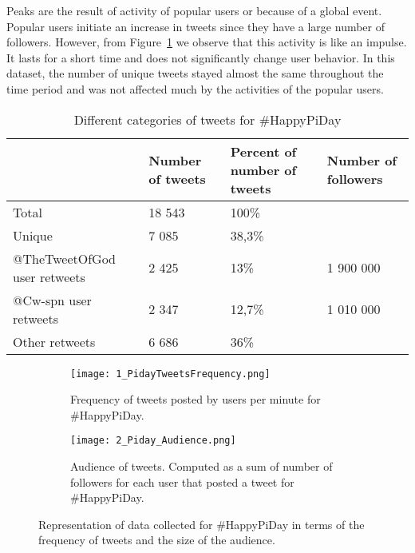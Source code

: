 \documentclass[journal, a4paper, 12pt]{article}
\begin{document}
Peaks are the result of activity of popular users or because of a global event. Popular users initiate an increase in tweets since they have a large number of followers. However, from Figure~\ref{fig:piday_freq_tweets} we observe that this activity is like an impulse. It lasts for a short time and does not significantly change user behavior. In this dataset, the number of unique tweets stayed almost the same throughout the time period and was not affected much by the activities of the popular users.
\\
	
    
    \begin{table}[!hbt]
		\begin{center}
		\caption{Different categories of tweets for \#HappyPiDay}
		\label{tab:numberoftweets_piday}
		\begin{tabular}{|p{4cm}|p{2cm}|p{2cm}|p{2cm}|}
			\hline
			 & Number of tweets & Percent of number of tweets & Number of followers \\
            \hline
			Total & 18 543 & 100\% & \\
			\hline
			Unique & 7 085  &  38,3\%  & \\
			\hline
			@TheTweetOfGod user retweets & 2 425 & 13\% & 1 900 000\\
            \hline
            @Cw-spn user retweets & 2 347 & 12,7\% & 1 010 000\\
			\hline
            Other retweets & 6 686 & 36\% &\\
			\hline
		\end{tabular}
		\end{center}
	\end{table}
    
    
    \begin{figure}[!hbt]
\begin{subfigure}{1\textwidth}
\texttt{[image: 1\_PidayTweetsFrequency.png]}
\caption{Frequency of tweets posted by users per minute for \#HappyPiDay.}
\label{fig:piday_freq_tweets}
\end{subfigure}
\begin{subfigure}{1\textwidth}
\texttt{[image: 2\_Piday\_Audience.png]}
\caption{Audience of tweets. Computed as a sum of number of followers for each user that posted a tweet for \#HappyPiDay.}
\label{fig:piday_audience}
\end{subfigure}
 
\caption{Representation of data collected for \#HappyPiDay in terms of the frequency of tweets and the size of the audience.}
\label{fig:piday_tweets_and_audience}
\end{figure}
   
\end{document}
